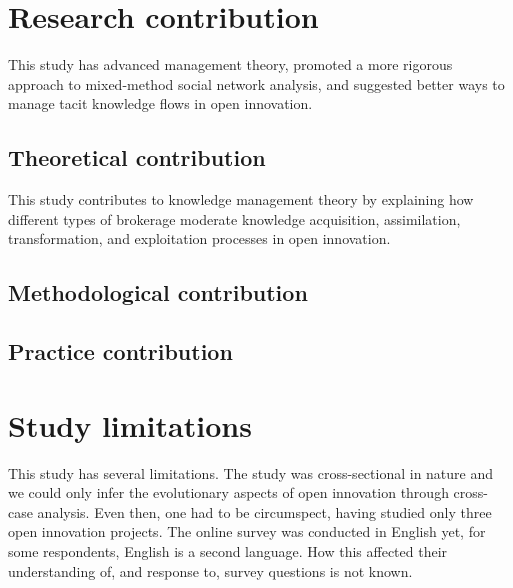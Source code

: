 
\section{Research contribution}

This study has advanced management theory, promoted a more rigorous approach to mixed-method social network analysis, and suggested better ways to manage tacit knowledge flows in open innovation.

\subsection{Theoretical contribution}

This study contributes to knowledge management theory by explaining how different types of brokerage moderate knowledge acquisition, assimilation, transformation, and exploitation processes in open innovation.

\subsection{Methodological contribution}


\subsection{Practice contribution}




\section{Study limitations}

This study has several limitations. The study was cross-sectional in nature and we could only infer the evolutionary aspects of open innovation through cross-case analysis. Even then, one had to be circumspect, having studied only three open innovation projects. The online survey was conducted in English yet, for some respondents, English is a second language. How this affected their understanding of, and response to, survey questions is not known. \medskip

